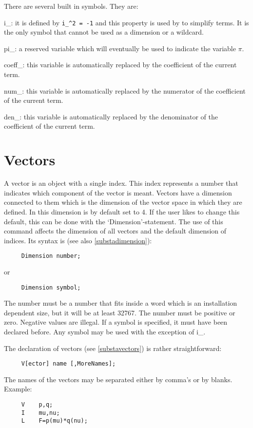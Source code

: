 There are several built in symbols. They are:

\noindent i\_: it is defined by \verb:i_^2 = -1: and this 
property is used by {\FORM} to simplify terms. It is the only symbol that 
cannot be used as a dimension or a wildcard.

\noindent pi\_: a reserved variable which will eventually be 
used to indicate the variable $\pi$.

\noindent coeff\_: this variable is automatically replaced 
by the coefficient of the current term.

\noindent num\_: this variable is automatically replaced by 
the numerator of the coefficient of the current term.

\noindent den\_: this variable is automatically replaced by 
the denominator of the coefficient of the current term.


\section{Vectors}

\label{sect-vectors}
A vector is an object with a single index. This 
index represents a number that indicates which component of the vector is 
meant. Vectors have a dimension connected to them which is 
the dimension of the vector space in which they are defined. In {\FORM} 
this dimension is by default set to 4. If the user likes to change this 
default, this can be done with the `Dimension'-statement. The use of this 
command affects the dimension of all vectors and the default dimension of 
indices. Its syntax is (see also \ref{substadimension}):
\begin{verbatim}
     Dimension number;
\end{verbatim}
or
\begin{verbatim}
     Dimension symbol;
\end{verbatim}
The number must be a number that fits inside a {\FORM} word which is 
an installation dependent size, but it will be at least 32767. 
The number must be positive or zero. Negative values are illegal. 
If a symbol is specified, it must have been declared before. Any symbol 
may be used with the exception of i\_. 

The declaration of vectors (see \ref{substavectors}) is rather 
straightforward:
\begin{verbatim}
     V[ector] name [,MoreNames];
\end{verbatim}
The names of the vectors may be separated either by comma's or 
by blanks. Example: 
\begin{verbatim}
     V    p,q;
     I    mu,nu;
     L    F=p(mu)*q(nu);
\end{verbatim}

